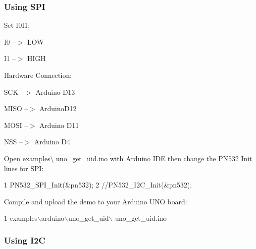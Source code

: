 \subsubsection*{Using S\+P\+I}


\begin{DoxyEnumerate}
\item Set I0\+I1\+:
\end{DoxyEnumerate}
\begin{DoxyItemize}
\item I0 --$>$ L\+O\+W
\item I1 --$>$ H\+I\+G\+H
\end{DoxyItemize}
\begin{DoxyEnumerate}
\item Hardware Connection\+:
\end{DoxyEnumerate}
\begin{DoxyItemize}
\item S\+C\+K --$>$ Arduino D13
\item M\+I\+S\+O --$>$ Arduino\+D12
\item M\+O\+S\+I --$>$ Arduino D11
\item N\+S\+S --$>$ Arduino D4
\end{DoxyItemize}
\begin{DoxyEnumerate}
\item Open examples\textbackslash{} uno\+\_\+get\+\_\+uid.\+ino with Arduino I\+D\+E then change the P\+N532 Init lines for S\+P\+I\+: 
\begin{DoxyCode}
1 PN532\_SPI\_Init(&pn532);
2 //PN532\_I2C\_Init(&pn532);
\end{DoxyCode}

\item Compile and upload the demo to your Arduino U\+N\+O board\+: 
\begin{DoxyCode}
1 examples\(\backslash\)arduino\(\backslash\)uno\_get\_uid\(\backslash\) uno\_get\_uid.ino
\end{DoxyCode}

\end{DoxyEnumerate}

\subsubsection*{Using I2\+C}


